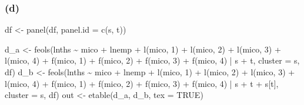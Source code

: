 \documentclass[
]{article}
\newenvironment{Shaded}{\begin{snugshade}}{\end{snugshade}}
\newcommand{\AttributeTok}[1]{\textcolor[rgb]{0.77,0.63,0.00}{#1}}
\newcommand{\ConstantTok}[1]{\textcolor[rgb]{0.00,0.00,0.00}{#1}}
\newcommand{\DecValTok}[1]{\textcolor[rgb]{0.00,0.00,0.81}{#1}}
\newcommand{\FunctionTok}[1]{\textcolor[rgb]{0.00,0.00,0.00}{#1}}
\newcommand{\NormalTok}[1]{#1}
\newcommand{\OtherTok}[1]{\textcolor[rgb]{0.56,0.35,0.01}{#1}}
\newcommand{\SpecialCharTok}[1]{\textcolor[rgb]{0.00,0.00,0.00}{#1}}
\newcommand{\StringTok}[1]{\textcolor[rgb]{0.31,0.60,0.02}{#1}}
\begin{document}
\hypertarget{d-2}{%
\subsubsection{(d)}\label{d-2}}

\begin{Shaded}
\begin{Highlighting}[]
\NormalTok{df }\OtherTok{\textless{}{-}} \FunctionTok{panel}\NormalTok{(df, }\AttributeTok{panel.id =} \FunctionTok{c}\NormalTok{(}\StringTok{\textquotesingle{}s\textquotesingle{}}\NormalTok{, }\StringTok{\textquotesingle{}t\textquotesingle{}}\NormalTok{))}
  
\NormalTok{d\_a }\OtherTok{\textless{}{-}} \FunctionTok{feols}\NormalTok{(lnths }\SpecialCharTok{\textasciitilde{}}\NormalTok{ mico }\SpecialCharTok{+}\NormalTok{ lnemp }\SpecialCharTok{+} 
               \FunctionTok{l}\NormalTok{(mico, }\DecValTok{1}\NormalTok{) }\SpecialCharTok{+} \FunctionTok{l}\NormalTok{(mico, }\DecValTok{2}\NormalTok{) }\SpecialCharTok{+} \FunctionTok{l}\NormalTok{(mico, }\DecValTok{3}\NormalTok{) }\SpecialCharTok{+} \FunctionTok{l}\NormalTok{(mico, }\DecValTok{4}\NormalTok{) }\SpecialCharTok{+}
               \FunctionTok{f}\NormalTok{(mico, }\DecValTok{1}\NormalTok{) }\SpecialCharTok{+} \FunctionTok{f}\NormalTok{(mico, }\DecValTok{2}\NormalTok{) }\SpecialCharTok{+} \FunctionTok{f}\NormalTok{(mico, }\DecValTok{3}\NormalTok{) }\SpecialCharTok{+} \FunctionTok{f}\NormalTok{(mico, }\DecValTok{4}\NormalTok{) }
               \SpecialCharTok{|}\NormalTok{ s }\SpecialCharTok{+}\NormalTok{ t, }\AttributeTok{cluster =} \StringTok{\textquotesingle{}s\textquotesingle{}}\NormalTok{, df)}
\NormalTok{d\_b }\OtherTok{\textless{}{-}} \FunctionTok{feols}\NormalTok{(lnths }\SpecialCharTok{\textasciitilde{}}\NormalTok{ mico }\SpecialCharTok{+}\NormalTok{ lnemp }\SpecialCharTok{+} 
               \FunctionTok{l}\NormalTok{(mico, }\DecValTok{1}\NormalTok{) }\SpecialCharTok{+} \FunctionTok{l}\NormalTok{(mico, }\DecValTok{2}\NormalTok{) }\SpecialCharTok{+} \FunctionTok{l}\NormalTok{(mico, }\DecValTok{3}\NormalTok{) }\SpecialCharTok{+} \FunctionTok{l}\NormalTok{(mico, }\DecValTok{4}\NormalTok{) }\SpecialCharTok{+}
               \FunctionTok{f}\NormalTok{(mico, }\DecValTok{1}\NormalTok{) }\SpecialCharTok{+} \FunctionTok{f}\NormalTok{(mico, }\DecValTok{2}\NormalTok{) }\SpecialCharTok{+} \FunctionTok{f}\NormalTok{(mico, }\DecValTok{3}\NormalTok{) }\SpecialCharTok{+} \FunctionTok{f}\NormalTok{(mico, }\DecValTok{4}\NormalTok{) }
               \SpecialCharTok{|}\NormalTok{ s }\SpecialCharTok{+}\NormalTok{ t }\SpecialCharTok{+}\NormalTok{ s[t], }\AttributeTok{cluster =} \StringTok{\textquotesingle{}s\textquotesingle{}}\NormalTok{, df)}
\NormalTok{out }\OtherTok{\textless{}{-}} \FunctionTok{etable}\NormalTok{(d\_a, d\_b, }\AttributeTok{tex =} \ConstantTok{TRUE}\NormalTok{) }
\end{Highlighting}
\end{Shaded}
\end{document}
